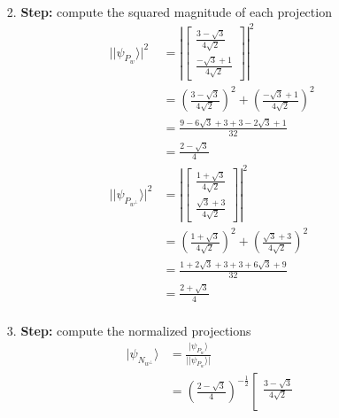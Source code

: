 \documentclass[main.tex]{subfiles}
\begin{document}
\begin{enumerate}
\begin{enumerate}
\begin{enumerate}
\begin{align*}
                \end{align*}
            \item [] \textbf{Step:} compute the squared magnitude of each projection
                \begin{align*}
                    ||\psi_{P_{w}}\rangle|^2            & = \left|\left[\begin{array}{l} \frac{3-\sqrt{3}}{4\sqrt{2}} \\
                                                        \frac{-\sqrt{3}+1}{4\sqrt{2}}\end{array}\right]\right|^2\\
                                                        & = \left(\frac{3-\sqrt{3}}{4\sqrt{2}}\right)^2 + \left(\frac{-\sqrt{3}+1}{4\sqrt{2}}\right)^2\\
                                                        & = \frac{9-6\sqrt{3}+3+3-2\sqrt{3}+1}{32} \\
                                                        & = \frac{2-\sqrt{3}}{4}\\
                    ||\psi_{P_{w^{\perp}}}\rangle|^2    & = \left|\left[\begin{array}{l} \frac{1+\sqrt{3}}{4\sqrt{2}} \\
                                                        \frac{\sqrt{3}+3}{4\sqrt{2}}\end{array}\right]\right|^2\\
                                                        & = \left(\frac{1+\sqrt{3}}{4\sqrt{2}}\right)^2 + \left(\frac{\sqrt{3}+3}{4\sqrt{2}}\right)^2\\
                                                        & = \frac{1+2\sqrt{3}+3+3+6\sqrt{3}+9}{32} \\
                                                        & = \frac{2+\sqrt{3}}{4}\\
                \end{align*}
            \item [] \textbf{Step:} compute the normalized projections
                \begin{align*}
                    |\psi_{N_{w^{\perp}}}\rangle    & = \frac{|\psi_{P_{w}}\rangle}{||\psi_{P_{w}}\rangle|}\\
                                                    & = \left(\frac{2-\sqrt{3}}{4}\right)^{-\frac{1}{2}}
                                                    \left[\begin{array}{l} \frac{3-\sqrt{3}}{4\sqrt{2}} \\  

\end{array}
\end{align*}
\end{enumerate}
\end{enumerate}
\end{enumerate}
\end{document}
